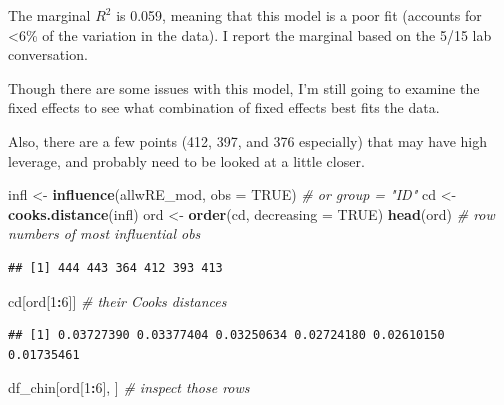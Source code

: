 \documentclass[
]{article}
\newenvironment{Shaded}{\begin{snugshade}}{\end{snugshade}}
\newcommand{\AttributeTok}[1]{\textcolor[rgb]{0.13,0.29,0.53}{#1}}
\newcommand{\CommentTok}[1]{\textcolor[rgb]{0.56,0.35,0.01}{\textit{#1}}}
\newcommand{\ConstantTok}[1]{\textcolor[rgb]{0.56,0.35,0.01}{#1}}
\newcommand{\DecValTok}[1]{\textcolor[rgb]{0.00,0.00,0.81}{#1}}
\newcommand{\FunctionTok}[1]{\textcolor[rgb]{0.13,0.29,0.53}{\textbf{#1}}}
\newcommand{\NormalTok}[1]{#1}
\newcommand{\OtherTok}[1]{\textcolor[rgb]{0.56,0.35,0.01}{#1}}
\newcommand{\SpecialCharTok}[1]{\textcolor[rgb]{0.81,0.36,0.00}{\textbf{#1}}}
\begin{document}
The marginal \(R^2\) is 0.059, meaning that this model is a poor fit
(accounts for \textless6\% of the variation in the data). I report the
marginal based on the 5/15 lab conversation.

Though there are some issues with this model, I'm still going to examine
the fixed effects to see what combination of fixed effects best fits the
data.

Also, there are a few points (412, 397, and 376 especially) that may
have high leverage, and probably need to be looked at a little closer.

\begin{Shaded}
\begin{Highlighting}[]
\NormalTok{infl  }\OtherTok{\textless{}{-}} \FunctionTok{influence}\NormalTok{(allwRE\_mod, }\AttributeTok{obs =} \ConstantTok{TRUE}\NormalTok{)      }\CommentTok{\# or group = "ID"}
\NormalTok{cd    }\OtherTok{\textless{}{-}} \FunctionTok{cooks.distance}\NormalTok{(infl)}
\NormalTok{ord   }\OtherTok{\textless{}{-}} \FunctionTok{order}\NormalTok{(cd, }\AttributeTok{decreasing =} \ConstantTok{TRUE}\NormalTok{)}
\FunctionTok{head}\NormalTok{(ord)              }\CommentTok{\# row numbers of most influential obs}
\end{Highlighting}
\end{Shaded}

\begin{verbatim}
## [1] 444 443 364 412 393 413
\end{verbatim}

\begin{Shaded}
\begin{Highlighting}[]
\NormalTok{cd[ord[}\DecValTok{1}\SpecialCharTok{:}\DecValTok{6}\NormalTok{]]          }\CommentTok{\# their Cook\textquotesingle{}s distances}
\end{Highlighting}
\end{Shaded}

\begin{verbatim}
## [1] 0.03727390 0.03377404 0.03250634 0.02724180 0.02610150 0.01735461
\end{verbatim}

\begin{Shaded}
\begin{Highlighting}[]
\NormalTok{df\_chin[ord[}\DecValTok{1}\SpecialCharTok{:}\DecValTok{6}\NormalTok{], ]   }\CommentTok{\# inspect those rows}
\end{Highlighting}
\end{Shaded}
\end{document}

